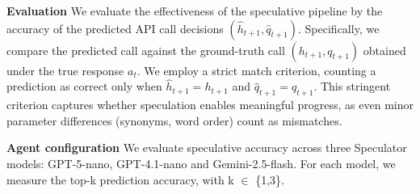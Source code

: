 


\textbf{Evaluation}
We evaluate the effectiveness of the speculative pipeline by the accuracy of the predicted API call decisions $(\hat{h}_{t+1}, \hat{q}_{t+1})$. Specifically, we compare the predicted call against the ground-truth call $(h_{t+1}, q_{t+1})$ obtained under the true response $a_t$. We employ a strict match criterion, counting a prediction as correct only when $\hat{h}_{t+1} = h_{t+1}$ and $\hat{q}_{t+1} = q_{t+1}$. This stringent criterion captures whether speculation enables meaningful progress, as even minor parameter differences (synonyms, word order) count as mismatches.

\textbf{Agent configuration}
We evaluate speculative accuracy across three Speculator models: GPT-5-nano, GPT-4.1-nano and Gemini-2.5-flash. For each model, we measure the top-k prediction accuracy, with k $\in$ \{1,3\}.

